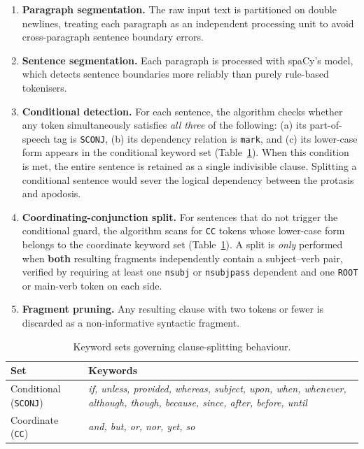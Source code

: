 \documentclass[assignment.tex]{subfiles}
\begin{document}
\begin{enumerate}[leftmargin=*, itemsep=4pt]
    \item \textbf{Paragraph segmentation.}  The raw input text is partitioned on
          double newlines, treating each paragraph as an independent processing unit
          to avoid cross-paragraph sentence boundary errors.

    \item \textbf{Sentence segmentation.}  Each paragraph is processed with
          spaCy's  model, which detects sentence boundaries
          more reliably than purely rule-based tokenisers.

    \item \textbf{Conditional detection.}  For each sentence, the algorithm checks
          whether any token simultaneously satisfies \emph{all three} of the
          following: (a) its part-of-speech tag is \texttt{SCONJ}, (b) its
          dependency relation is \texttt{mark}, and (c) its lower-case form appears
          in the conditional keyword set (Table~\ref{tab:split-keywords}).  When
          this condition is met, the entire sentence is retained as a single
          indivisible clause.  Splitting a conditional sentence would sever the
          logical dependency between the protasis and apodosis.

    \item \textbf{Coordinating-conjunction split.}  For sentences that do not
          trigger the conditional guard, the algorithm scans for \texttt{CC} tokens
          whose lower-case form belongs to the coordinate keyword set
          (Table~\ref{tab:split-keywords}).  A split is \emph{only} performed when
          \textbf{both} resulting fragments independently contain a subject--verb
          pair, verified by requiring at least one \texttt{nsubj} or
          \texttt{nsubjpass} dependent and one \texttt{ROOT} or main-verb token on
          each side.

    \item \textbf{Fragment pruning.}  Any resulting clause with two tokens or fewer
          is discarded as a non-informative syntactic fragment.
\end{enumerate}

\begin{table}[H]
    \centering
    \caption{Keyword sets governing clause-splitting behaviour.}
    \label{tab:split-keywords}
    \begin{tabular}{@{}lp{9cm}@{}}
        \toprule
        \textbf{Set} & \textbf{Keywords} \\
        \midrule
        Conditional (\texttt{SCONJ}) &
            \textit{if, unless, provided, whereas, subject, upon, when, whenever,
            although, though, because, since, after, before, until} \\[4pt]
        Coordinate (\texttt{CC}) &
            \textit{and, but, or, nor, yet, so} \\
        \bottomrule
    \end{tabular}
\end{table}
\end{document}
